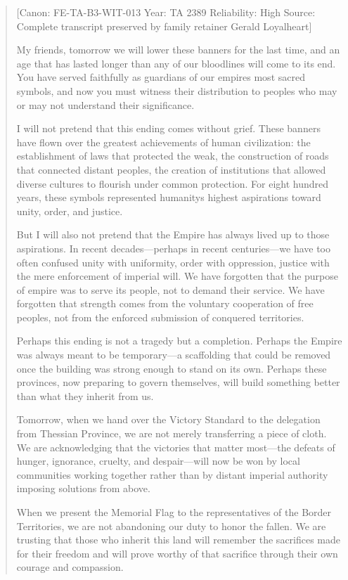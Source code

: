 \begin{quote}
{[}Canon: FE-TA-B3-WIT-013 \textbar{} Year: TA 2389 \textbar{}
Reliability: High \textbar{} Source: Complete transcript preserved by
family retainer Gerald Loyalheart{]}

My friends, tomorrow we will lower these banners for the last time, and
an age that has lasted longer than any of our bloodlines will come to
its end. You have served faithfully as guardians of our
empire\textquotesingle s most sacred symbols, and now you must witness
their distribution to peoples who may or may not understand their
significance.

I will not pretend that this ending comes without grief. These banners
have flown over the greatest achievements of human civilization: the
establishment of laws that protected the weak, the construction of roads
that connected distant peoples, the creation of institutions that
allowed diverse cultures to flourish under common protection. For eight
hundred years, these symbols represented humanity\textquotesingle s
highest aspirations toward unity, order, and justice.

But I will also not pretend that the Empire has always lived up to those
aspirations. In recent decades---perhaps in recent centuries---we have
too often confused unity with uniformity, order with oppression, justice
with the mere enforcement of imperial will. We have forgotten that the
purpose of empire was to serve its people, not to demand their service.
We have forgotten that strength comes from the voluntary cooperation of
free peoples, not from the enforced submission of conquered territories.

Perhaps this ending is not a tragedy but a completion. Perhaps the
Empire was always meant to be temporary---a scaffolding that could be
removed once the building was strong enough to stand on its own. Perhaps
these provinces, now preparing to govern themselves, will build
something better than what they inherit from us.

Tomorrow, when we hand over the Victory Standard to the delegation from
Thessian Province, we are not merely transferring a piece of cloth. We
are acknowledging that the victories that matter most---the defeats of
hunger, ignorance, cruelty, and despair---will now be won by local
communities working together rather than by distant imperial authority
imposing solutions from above.

When we present the Memorial Flag to the representatives of the Border
Territories, we are not abandoning our duty to honor the fallen. We are
trusting that those who inherit this land will remember the sacrifices
made for their freedom and will prove worthy of that sacrifice through
their own courage and compassion.


\end{quote}
